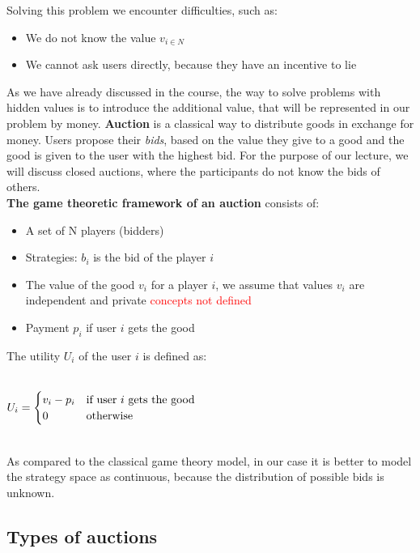 \documentclass{article}
\begin{document}
Solving this problem we encounter difficulties, such as: 
\begin{itemize}
	\item We do not know the value $v_{i \in N}$ 
	\item We cannot ask users directly, because they have an incentive to lie 
\end{itemize}
As we have already discussed in the course, the way to solve problems with hidden values is to introduce the additional value, that will be represented in our problem by money. \textbf{Auction} is a classical way to distribute goods in exchange for money. Users propose their \textit{bids}, based on the value they give to a good and the good is given to the user with the highest bid. For the purpose of our lecture, we will discuss closed auctions, where the participants do not know the bids of others.\\
\textbf{The game theoretic framework of an auction} consists of: 
\begin{itemize}
	\item A set of N players (bidders) 
	\item Strategies: $b_{i}$ is the bid of the player $i$ 
	\item The value of the good $v_{i}$ for a player $i$, we assume that values $v_i$ are independent and private \textcolor{red}{concepts not defined}
	\item Payment $p_{i}$ if user $i$ gets the good 
\end{itemize}
The utility $U_{i}$ of the user $i$ is defined as: 
\begin{center}
	\mbox{}\\
	$U_{i} = 
	\begin{cases}
		v_i - p_i \hfill & \text{if user $i$ gets the good}\\
		0 \hfill & \text{otherwise}\\
	\end{cases}
	$\\
	\mbox{}\\
\end{center}
As compared to the classical game theory model, in our case it is better to model the strategy space as continuous, because the distribution of possible bids is unknown. 
\subsection{Types of auctions}
\end{document}
